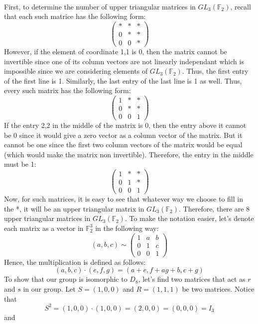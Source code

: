 \begin{solution}
    \\ First, to determine the number of upper triangular matrices in $GL_3(\mathbb{F}_2)$, recall that each such matrice has the following form:
    $$\begin{pmatrix} * & * & * \\ 0 & * & * \\ 0 & 0 & * \end{pmatrix}$$
    However, if the element of coordinate 1,1 is 0, then the matrix cannot be invertible since one of its column vectors are not linearly independant which is impossible since we are considering elements of $GL_3(\mathbb{F}_2)$. Thus, the first entry of the first line is 1. Similarly, the last entry of the last line is 1 as well. Thus, every such matrix has the following form:
    $$\begin{pmatrix} 1 & * & * \\ 0 & * & * \\ 0 & 0 & 1 \end{pmatrix}$$
    If the entry 2,2 in the middle of the matrix is 0, then the entry above it cannot be 0 since it would give a zero vector as a column vector of the matrix. But it cannot be one since the first two column vectors of the matrix would be equal (which would make the matrix non invertible). Therefore, the entry in the middle must be 1:
    $$\begin{pmatrix} 1 & * & * \\ 0 & 1 & * \\ 0 & 0 & 1 \end{pmatrix}$$
    Now, for such matrices, it is easy to see that whatever way we choose to fill in the *, it will be an upper triangular matrix in $GL_3(\mathbb{F}_2)$. Therefore, there are 8 upper triangular matrices in $GL_3(\mathbb{F}_2)$. To make the notation easier, let's denote each matrix as a vector in $\mathbb{F}_2^3$ in the following way:
    $$(a, b, c) \sim \begin{pmatrix} 1 & a & b \\ 0 & 1 & c \\ 0 & 0 & 1 \end{pmatrix}$$
    Hence, the multiplication is defined as follows:
    $$(a,b,c) \cdot (e,f,g) = (a+e, f+ag+b, c+g)$$
    To show that our group is isomorphic to $D_8$, let's find two matrices that act as $r$ and $s$ in our group. Let $S = (1,0,0)$ and $R = (1,1,1)$ be two matrices. Notice that 
    $$S^2 = (1,0,0)\cdot(1,0,0) = (2,0,0) = (0,0,0) = I_3$$
    and 
    \begin{align*}

\end{align*}
\end{solution}
